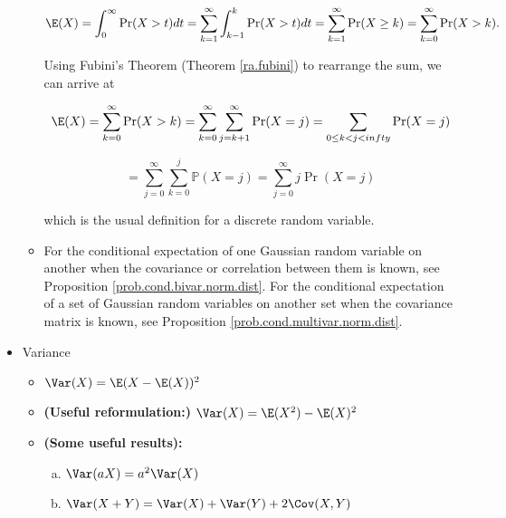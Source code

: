\begin{itemize}
\begin{itemize}
\begin{theorem}
\begin{remark}
\[
\E(X) = \int_0^\infty \Pr(X > t) dt = \sum_{k=1}^\infty \int_{k-1}^k \Pr(X >t) dt = \sum_{k=1}^\infty \Pr(X \geq k) = \sum_{k=0}^\infty \Pr(X > k).
\]

Using Fubini's Theorem (Theorem \ref{ra.fubini}) to rearrange the sum, we can arrive at

\[
\E(X) = \sum_{k=0}^\infty \Pr(X > k) = \sum_{k=0}^\infty \sum_{j=k+1}^\infty \Pr(X=j) = \sum_{0 \leq k < j < infty} \Pr(X=j) 
\]

\[
= \sum_{j=0}^\infty \sum_{k=0}^j \mathbb{P}(X=j) = \sum_{j=0}^\infty j \Pr(X=j)
\]

which is the usual definition for a discrete random variable.

\end{remark}

\end{theorem}

\item For the conditional expectation of one Gaussian random variable on another when the covariance or correlation between them is known, see Proposition \ref{prob.cond.bivar.norm.dist}. For the conditional expectation of a set of Gaussian random variables on another set when the covariance matrix is known, see Proposition \ref{prob.cond.multivar.norm.dist}. 

\end{itemize}

\item Variance

\begin{itemize}

\item \begin{definition} \( \Var(X) = \E(X - \E(X))^2\) \end{definition}

\item \begin{proposition} \textbf{(Useful reformulation:)} \(\Var(X) = \E(X^2) - \E(X)^2\) \end{proposition}

\item \begin{theorem} \textbf{(Some useful results):} 


\begin{enumerate}[(a)]

\item \(\Var(aX) = a^2 \Var(X)\)

\item \(\Var(X + Y) = \Var(X) + \Var(Y) + 2 \Cov(X, Y)\)


\end{enumerate}
\end{theorem}
\end{itemize}
\end{itemize}

